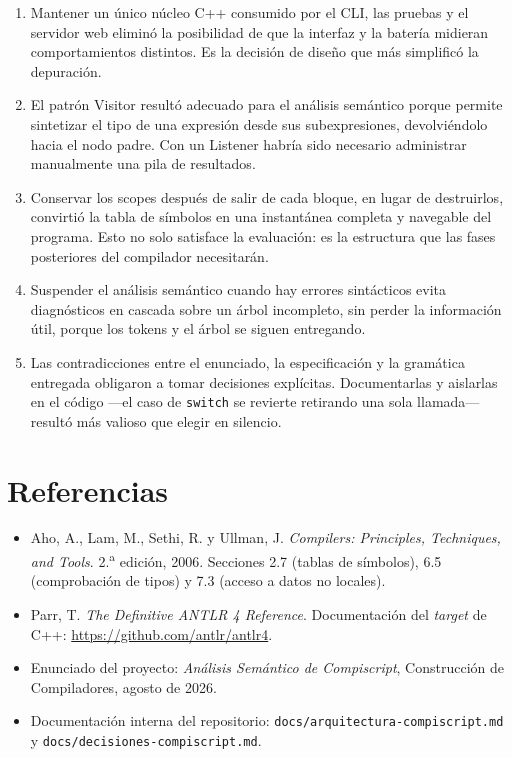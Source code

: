\documentclass[11pt,a4paper]{article}
\begin{document}
\begin{enumerate}[leftmargin=1.6em]
  \item Mantener un único núcleo C++ consumido por el CLI, las pruebas y el
        servidor web eliminó la posibilidad de que la interfaz y la batería
        midieran comportamientos distintos. Es la decisión de diseño que más
        simplificó la depuración.

  \item El patrón Visitor resultó adecuado para el análisis semántico porque
        permite sintetizar el tipo de una expresión desde sus subexpresiones,
        devolviéndolo hacia el nodo padre. Con un Listener habría sido necesario
        administrar manualmente una pila de resultados.

  \item Conservar los scopes después de salir de cada bloque, en lugar de
        destruirlos, convirtió la tabla de símbolos en una instantánea completa
        y navegable del programa. Esto no solo satisface la evaluación: es la
        estructura que las fases posteriores del compilador necesitarán.

  \item Suspender el análisis semántico cuando hay errores sintácticos evita
        diagnósticos en cascada sobre un árbol incompleto, sin perder la
        información útil, porque los tokens y el árbol se siguen entregando.

  \item Las contradicciones entre el enunciado, la especificación y la gramática
        entregada obligaron a tomar decisiones explícitas. Documentarlas y
        aislarlas en el código ---el caso de \texttt{switch} se revierte
        retirando una sola llamada--- resultó más valioso que elegir en
        silencio.
\end{enumerate}

\section{Referencias}

\sloppy
\begin{itemize}[leftmargin=1.4em]
  \item Aho, A., Lam, M., Sethi, R. y Ullman, J. \emph{Compilers: Principles,
        Techniques, and Tools}. 2.\textsuperscript{a} edición, 2006.
        Secciones 2.7 (tablas de símbolos), 6.5 (comprobación de tipos) y 7.3
        (acceso a datos no locales).
  \item Parr, T. \emph{The Definitive ANTLR 4 Reference}. Documentación del
        \emph{target} de C++: \url{https://github.com/antlr/antlr4}.
  \item Enunciado del proyecto: \emph{Análisis Semántico de Compiscript},
        Construcción de Compiladores, agosto de 2026.
  \item Documentación interna del repositorio:
        \texttt{docs/arquitectura-compiscript.md} y
        \texttt{docs/decisiones-compiscript.md}.
\end{itemize}
\end{document}

